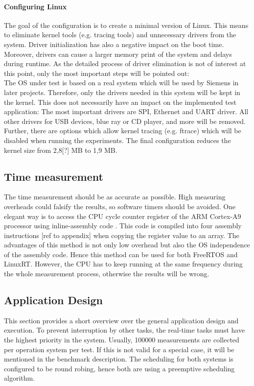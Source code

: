 \paragraph{Configuring Linux}
The goal of the configuration is to create a minimal version of Linux.
This means to eliminate kernel tools (e.g. tracing tools) and unnecessary drivers from the system. 
Driver initialization has also a negative impact on the boot time.
Moreover, drivers can cause a larger memory print of the system and delays during runtime. 
As the detailed process of driver elimination is not of interest at this point, only the most important steps will be pointed out:\\
The \ac{OS} under test is based on a real system which will be used by Siemens in later projects.
Therefore, only the drivers needed in this system will be kept in the kernel.
This does not necessarily have an impact on the implemented test application:
The most important drivers are \ac{SPI}, Ethernet and \ac{UART} driver.
All other drivers for \ac{USB} devices, blue ray or CD player, and more will be removed.
Further, there are options which allow kernel tracing (e.g. ftrace) which will be disabled when running the experiments.  
The final configuration reduces the kernel size from 2,8[?] MB to 1,9 MB. 

\subsection{Time measurement}
The time measurement should be as accurate as possible.
High measuring overheads could falsify the results, so software timers should be avoided. 
One elegant way is to access the \ac{CPU} cycle counter register of the ARM Cortex-A9 processor using inline-assembly code \cite{arm:aarmaaae}.
This code is compiled into four assembly instructions [ref to appendix] when copying the register value to an array.
The advantages of this method is not only low overhead but also the \ac{OS} independence of the assembly code.
Hence this method can be used for both FreeRTOS and LinuxRT.
However, the \ac{CPU} has to keep running at the same frequency during the whole measurement process, otherwise the results will be wrong.

\subsection{Application Design}
This section provides a short overview over the general application design and execution.
To prevent interruption by other tasks, the real-time tasks must have the highest priority in the system.
Usually, 100000 measurements are collected per operation system per test.
If this is not valid for a special case, it will be mentioned in the benchmark description.
The scheduling for both systems is configured to be round robing, hence both are using a preemptive scheduling algorithm.
 
